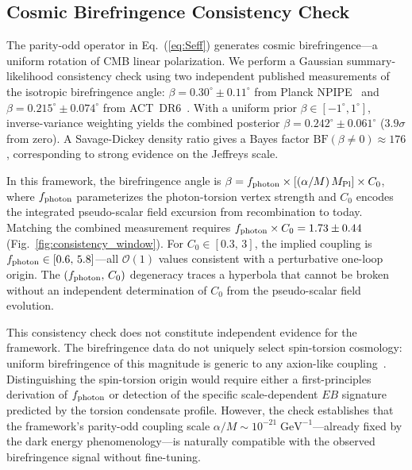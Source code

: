 \documentclass[aps,prd,twocolumn,superscriptaddress,showpacs,preprintnumbers,nofootinbib,longbibliography,floatfix]{revtex4-2}
\newcommand{\MPl}{M_{\rm Pl}}
\begin{document}
\subsection{Cosmic Birefringence Consistency Check}\label{sec:birefringence_check}

The parity-odd operator in Eq.~(\ref{eq:Seff}) generates cosmic birefringence---a uniform rotation of CMB linear polarization. We perform a Gaussian summary-likelihood consistency check using two independent published measurements of the isotropic birefringence angle: $\beta = 0.30^\circ \pm 0.11^\circ$ from Planck NPIPE~\cite{Eskilt2022} and $\beta = 0.215^\circ \pm 0.074^\circ$ from ACT~DR6~\cite{DiegoPalazuelos2025}. With a uniform prior $\beta \in [-1^\circ, 1^\circ]$, inverse-variance weighting yields the combined posterior $\beta = 0.242^\circ \pm 0.061^\circ$ ($3.9\sigma$ from zero). A Savage-Dickey density ratio gives a Bayes factor $\mathrm{BF}(\beta \neq 0) \approx 176$, corresponding to strong evidence on the Jeffreys scale.

In this framework, the birefringence angle is $\beta = f_{\rm photon} \times [(\alpha/M)\,\MPl] \times C_0$, where $f_{\rm photon}$ parameterizes the photon-torsion vertex strength and $C_0$ encodes the integrated pseudo-scalar field excursion from recombination to today. Matching the combined measurement requires $f_{\rm photon} \times C_0 = 1.73 \pm 0.44$ (Fig.~\ref{fig:consistency_window}). For $C_0 \in [0.3,\,3]$, the implied coupling is $f_{\rm photon} \in [0.6,\,5.8]$---all $\mathcal{O}(1)$ values consistent with a perturbative one-loop origin. The $(f_{\rm photon},\,C_0)$ degeneracy traces a hyperbola that cannot be broken without an independent determination of $C_0$ from the pseudo-scalar field evolution.

This consistency check does not constitute independent evidence for the framework. The birefringence data do not uniquely select spin-torsion cosmology: uniform birefringence of this magnitude is generic to any axion-like coupling~\cite{Carroll1998}. Distinguishing the spin-torsion origin would require either a first-principles derivation of $f_{\rm photon}$ or detection of the specific scale-dependent $EB$ signature predicted by the torsion condensate profile. However, the check establishes that the framework's parity-odd coupling scale $\alpha/M \sim 10^{-21}\;\text{GeV}^{-1}$---already fixed by the dark energy phenomenology---is naturally compatible with the observed birefringence signal without fine-tuning.
\end{document}
